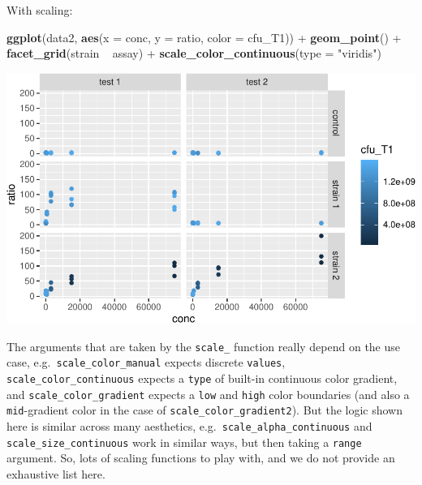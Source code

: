\documentclass[]{book}
\newenvironment{Shaded}{}{}
\newcommand{\DataTypeTok}[1]{\textcolor[rgb]{0.56,0.13,0.00}{#1}}
\newcommand{\KeywordTok}[1]{\textcolor[rgb]{0.00,0.44,0.13}{\textbf{#1}}}
\newcommand{\NormalTok}[1]{#1}
\newcommand{\OperatorTok}[1]{\textcolor[rgb]{0.40,0.40,0.40}{#1}}
\newcommand{\StringTok}[1]{\textcolor[rgb]{0.25,0.44,0.63}{#1}}
\begin{document}
With scaling:

\begin{Shaded}
\begin{Highlighting}[]
\KeywordTok{ggplot}\NormalTok{(data2, }\KeywordTok{aes}\NormalTok{(}\DataTypeTok{x =}\NormalTok{ conc, }\DataTypeTok{y =}\NormalTok{ ratio, }\DataTypeTok{color =}\NormalTok{ cfu_T1)) }\OperatorTok{+}
\StringTok{  }\KeywordTok{geom_point}\NormalTok{() }\OperatorTok{+}
\StringTok{  }\KeywordTok{facet_grid}\NormalTok{(strain }\OperatorTok{~}\StringTok{ }\NormalTok{assay) }\OperatorTok{+}
\StringTok{  }\KeywordTok{scale_color_continuous}\NormalTok{(}\DataTypeTok{type =} \StringTok{"viridis"}\NormalTok{)}
\end{Highlighting}
\end{Shaded}

\begin{center}\includegraphics[width=\textwidth]{TRES-Tidy-Tutorial_files/figure-latex/unnamed-chunk-140-1} \end{center}

The arguments that are taken by the \texttt{scale\_} function really depend on the use case, e.g.~\texttt{scale\_color\_manual} expects discrete \texttt{values}, \texttt{scale\_color\_continuous} expects a \texttt{type} of built-in continuous color gradient, and \texttt{scale\_color\_gradient} expects a \texttt{low} and \texttt{high} color boundaries (and also a \texttt{mid}-gradient color in the case of \texttt{scale\_color\_gradient2}). But the logic shown here is similar across many aesthetics, e.g.~\texttt{scale\_alpha\_continuous} and \texttt{scale\_size\_continuous} work in similar ways, but then taking a \texttt{range} argument. So, lots of scaling functions to play with, and we do not provide an exhaustive list here.
\end{document}
